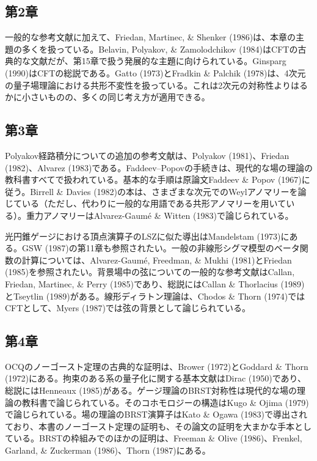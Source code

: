 \subsection*{第2章}
一般的な参考文献に加えて、Friedan, Martinec, \& Shenker (1986)は、本章の主題の多くを扱っている。Belavin, Polyakov, \& Zamolodchikov (1984)はCFTの古典的な文献だが、第15章で扱う発展的な主題に向けられている。Ginsparg (1990)はCFTの総説である。Gatto (1973)とFradkin \& Palchik (1978)は、4次元の量子場理論における共形不変性を扱っている。これは2次元の対称性よりはるかに小さいものの、多くの同じ考え方が適用できる。

\subsection*{第3章}
Polyakov経路積分についての追加の参考文献は、Polyakov (1981)、Friedan (1982)、Alvarez (1983)である。Faddeev--Popovの手続きは、現代的な場の理論の教科書すべてで扱われている。基本的な手順は原論文Faddeev \& Popov (1967)に従う。Birrell \& Davies (1982)の本は、さまざまな次元でのWeylアノマリーを論じている（ただし、代わりに一般的な用語である共形アノマリーを用いている）。重力アノマリーはAlvarez-Gaumé \& Witten (1983)で論じられている。

光円錐ゲージにおける頂点演算子のLSZに似た導出はMandelstam (1973)にある。GSW (1987)の第11章も参照されたい。一般の非線形シグマ模型のベータ関数の計算については、Alvarez-Gaumé, Freedman, \& Mukhi (1981)とFriedan (1985)を参照されたい。背景場中の弦についての一般的な参考文献はCallan, Friedan, Martinec, \& Perry (1985)であり、総説にはCallan \& Thorlacius (1989)とTseytlin (1989)がある。線形ディラトン理論は、Chodos \& Thorn (1974)ではCFTとして、Myers (1987)では弦の背景として論じられている。

\subsection*{第4章}
OCQのノーゴースト定理の古典的な証明は、Brower (1972)とGoddard \& Thorn (1972)にある。拘束のある系の量子化に関する基本文献はDirac (1950)であり、総説にはHenneaux (1985)がある。ゲージ理論のBRST対称性は現代的な場の理論の教科書で論じられている。そのコホモロジーの構造はKugo \& Ojima (1979)で論じられている。場の理論のBRST演算子はKato \& Ogawa (1983)で導出されており、本書のノーゴースト定理の証明も、その論文の証明を大まかな手本としている。BRSTの枠組みでのほかの証明は、Freeman \& Olive (1986)、Frenkel, Garland, \& Zuckerman (1986)、Thorn (1987)にある。

